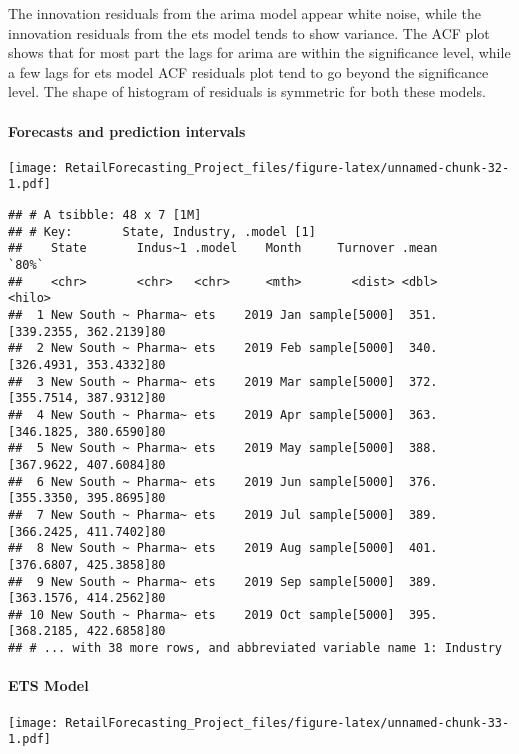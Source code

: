 \documentclass[
]{article}
\begin{document}
The innovation residuals from the arima model appear white noise, while
the innovation residuals from the ets model tends to show variance. The
ACF plot shows that for most part the lags for arima are within the
significance level, while a few lags for ets model ACF residuals plot
tend to go beyond the significance level. The shape of histogram of
residuals is symmetric for both these models.

\hypertarget{forecasts-and-prediction-intervals}{%
\paragraph{Forecasts and prediction
intervals}\label{forecasts-and-prediction-intervals}}

\texttt{[image: RetailForecasting\_Project\_files/figure-latex/unnamed-chunk-32-1.pdf]}

\begin{verbatim}
## # A tsibble: 48 x 7 [1M]
## # Key:       State, Industry, .model [1]
##    State       Indus~1 .model    Month     Turnover .mean                  `80%`
##    <chr>       <chr>   <chr>     <mth>       <dist> <dbl>                 <hilo>
##  1 New South ~ Pharma~ ets    2019 Jan sample[5000]  351. [339.2355, 362.2139]80
##  2 New South ~ Pharma~ ets    2019 Feb sample[5000]  340. [326.4931, 353.4332]80
##  3 New South ~ Pharma~ ets    2019 Mar sample[5000]  372. [355.7514, 387.9312]80
##  4 New South ~ Pharma~ ets    2019 Apr sample[5000]  363. [346.1825, 380.6590]80
##  5 New South ~ Pharma~ ets    2019 May sample[5000]  388. [367.9622, 407.6084]80
##  6 New South ~ Pharma~ ets    2019 Jun sample[5000]  376. [355.3350, 395.8695]80
##  7 New South ~ Pharma~ ets    2019 Jul sample[5000]  389. [366.2425, 411.7402]80
##  8 New South ~ Pharma~ ets    2019 Aug sample[5000]  401. [376.6807, 425.3858]80
##  9 New South ~ Pharma~ ets    2019 Sep sample[5000]  389. [363.1576, 414.2562]80
## 10 New South ~ Pharma~ ets    2019 Oct sample[5000]  395. [368.2185, 422.6858]80
## # ... with 38 more rows, and abbreviated variable name 1: Industry
\end{verbatim}

\hypertarget{ets-model}{%
\paragraph{ETS Model}\label{ets-model}}

\texttt{[image: RetailForecasting\_Project\_files/figure-latex/unnamed-chunk-33-1.pdf]}
\end{document}
